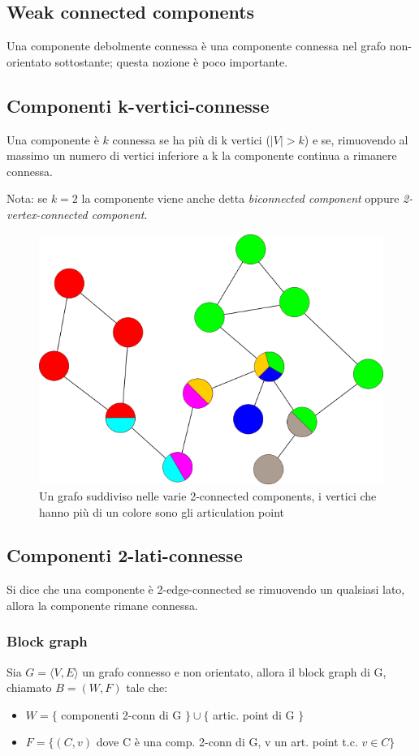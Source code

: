 \documentclass[12pt,a4paper]{article}
\begin{document}
\subsection{Weak connected components}
Una componente debolmente connessa è una componente connessa nel grafo non-orientato sottostante; questa nozione è poco importante.

\subsection{Componenti k-vertici-connesse}
Una componente è $k$ connessa se ha più di k vertici ($\vert V \vert > k$) e se, rimuovendo al massimo un numero di vertici inferiore a k la componente continua a rimanere connessa.

Nota: se $k=2$ la componente viene anche detta \textit{biconnected component} oppure \textit{2-vertex-connected component}.

\begin{figure}[h]
	\centering
	\includegraphics[width=0.5\linewidth]{img/Graph-Biconn-Comp.svg.png}
	\caption{Un grafo suddiviso nelle varie 2-connected components, i vertici che hanno più di un colore sono gli articulation point}
	\label{fig:2-conn-comp}
\end{figure}

\subsection{Componenti 2-lati-connesse}
Si dice che una componente è 2-edge-connected se rimuovendo un qualsiasi lato, allora la componente rimane connessa.

\subsubsection{Block graph}
Sia $G = \langle V, E \rangle$ un grafo connesso e non orientato, allora il block graph di G, chiamato $B = (W, F)$ tale che:
\begin{itemize}
\item $W = \lbrace$ componenti 2-conn di G $\rbrace \cup \lbrace$ artic. point di G $\rbrace$
\item $F = \lbrace (C, v)$ dove C è una comp. 2-conn di G, v un art. point t.c. $v \in C\rbrace$
\end{itemize}
\end{document}
